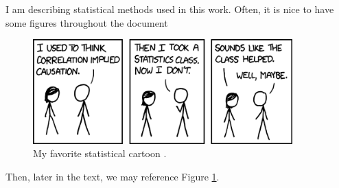 I am describing statistical methods used in this work. Often, it is nice to have
some figures throughout the document

\begin{figure}[h]
\centering
\includegraphics[width=10cm]{figures/correlation}
\caption{My favorite statistical cartoon \citep{xkcd}.}
\label{cartoon}
\end{figure}

Then, later in the text, we may reference Figure \ref{cartoon}.
